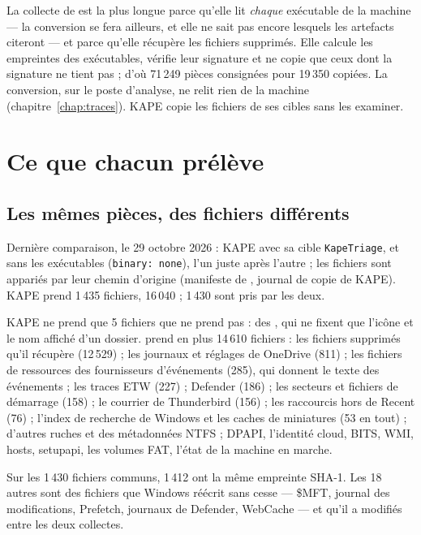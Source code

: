 \documentclass[11pt,a4paper,oneside]{report}
\begin{document}
La collecte de \wac{} est la plus longue parce qu'elle lit \emph{chaque} exécutable
de la machine --- la conversion se fera ailleurs, et elle ne sait pas encore
lesquels les artefacts citeront --- et parce qu'elle récupère les fichiers
supprimés. Elle calcule les empreintes des exécutables, vérifie leur signature
et ne copie que ceux dont la signature ne tient pas ; d'où 71\,249 pièces
consignées pour 19\,350 copiées. La conversion, sur le poste d'analyse, ne
relit rien de la machine (chapitre~\ref{chap:traces}). KAPE copie les fichiers
de ses cibles sans les examiner.

\chapter{Ce que chacun prélève}\label{chap:prelevement}

\section{Les mêmes pièces, des fichiers différents}

Dernière comparaison, le 29 octobre 2026 : KAPE avec sa cible
\texttt{KapeTriage}, et \wac{} sans les exécutables (\texttt{binary: none}),
l'un juste après l'autre ; les fichiers sont appariés par leur chemin
d'origine (manifeste de \wac{}, journal de copie de KAPE). KAPE prend 1\,435
fichiers, \wac{} 16\,040 ; 1\,430 sont pris par les deux.

KAPE ne prend que 5 fichiers que \wac{} ne prend pas : des ,
qui ne fixent que l'icône et le nom affiché d'un dossier. \wac{} prend en plus
14\,610 fichiers : les fichiers supprimés qu'il récupère (12\,529) ; les journaux
et réglages de OneDrive (811) ; les fichiers de ressources des fournisseurs
d'événements (285), qui donnent le texte des événements ; les traces ETW
(227) ; Defender (186) ; les secteurs et fichiers de démarrage (158) ; le
courrier de Thunderbird (156) ; les raccourcis hors de Recent (76) ; l'index
de recherche de Windows et les caches de miniatures (53 en tout) ; d'autres
ruches et des métadonnées NTFS ; DPAPI, l'identité cloud, BITS, WMI, hosts,
setupapi, les volumes FAT, l'état de la machine en marche.

Sur les 1\,430 fichiers communs, 1\,412 ont la même empreinte SHA-1. Les 18
autres sont des fichiers que Windows réécrit sans cesse --- \$MFT, journal des
modifications, Prefetch, journaux de Defender, WebCache --- et qu'il a modifiés
entre les deux collectes.
\end{document}
